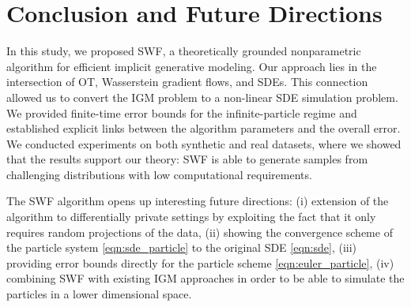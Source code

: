 
\section{Conclusion and Future Directions}

In this study, we proposed SWF, a theoretically grounded nonparametric algorithm for efficient implicit generative modeling. 
Our approach lies in the intersection of OT, Wasserstein gradient flows, and SDEs. This connection allowed us to convert the IGM problem to a non-linear SDE simulation problem. We provided finite-time error bounds for the infinite-particle regime and established explicit links between the algorithm parameters and the overall error. 
%
We conducted experiments on both synthetic and real datasets, where we showed that the results support our theory: SWF is able to generate samples from challenging distributions with low computational requirements. 

The SWF algorithm opens up interesting future directions: (i) extension of the algorithm to differentially private settings \cite{dwork2014algorithmic} by exploiting the fact that it only requires random projections of the data, (ii) showing the convergence scheme of the particle system \eqref{eqn:sde_particle} to the original SDE \eqref{eqn:sde}, (iii) providing error bounds directly for the particle scheme \eqref{eqn:euler_particle}, (iv) combining SWF with existing IGM approaches in order to be able to simulate the particles in a lower dimensional space.  
 